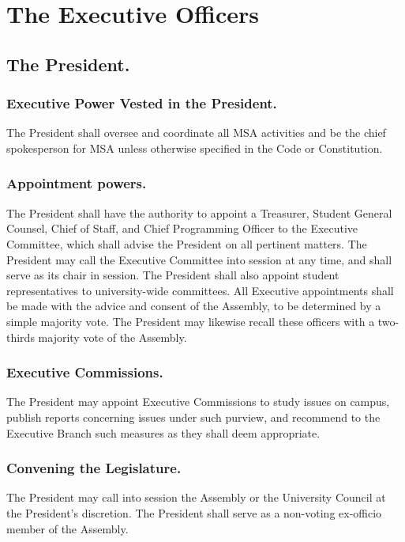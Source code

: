 
\section{The Executive Officers}

\subsection{The President.}
\subsubsection{Executive Power Vested in the President.}
The President shall oversee and coordinate all MSA activities and be the chief spokesperson for MSA unless otherwise specified in the Code or Constitution.
\subsubsection{Appointment powers.}
    The President shall have the authority to appoint a Treasurer, Student General Counsel, Chief of Staff, and Chief Programming Officer to the Executive Committee, which shall advise the President on all pertinent matters. The President may call the Executive Committee into session at any time, and shall serve as its chair in session.
	The President shall also appoint student representatives to university-wide committees.
	All Executive appointments shall be made with the advice and consent of the Assembly, to be determined by a simple majority vote.
	The President may likewise recall these officers with a two-thirds majority vote of the Assembly. 
	
\subsubsection{Executive Commissions.}
The President may appoint Executive Commissions to study issues on campus, publish reports concerning issues under such purview, and recommend to the Executive Branch such measures as they shall deem appropriate.

\subsubsection{Convening the Legislature.}
The President may call into session the Assembly or the University Council at the President's discretion. The President shall serve as a non-voting ex-officio member of the Assembly.

